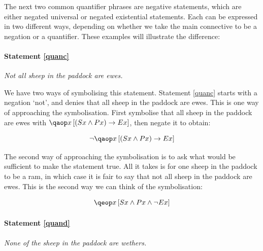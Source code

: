 \documentclass[PHIL101-Textbook.tex]{subfiles}
\begin{document}
The next two common quantifier phrases are negative statements, which are either negated universal or negated existential statements. Each can be expressed in two different ways, depending on whether we take the main connective to be a negation or a quantifier. These examples will illustrate the difference:

\paragraph{Statement \ref{quanc}} \emph{Not all sheep in the paddock are ewes.}

We have two ways of symbolising this statement.
Statement \ref{quanc} starts with a negation `not', and denies that all sheep in the paddock are ewes. This is one way of approaching the symbolisation. First symbolise that all sheep in the paddock are ewes with $\qab{x}{(S x \eand P x ) \eif E x }$, then negate it to obtain:

$$\enot \qab{x}{(S x \eand P x ) \eif E x }$$

\noindent The second way of approaching the symbolisation is to ask what would be sufficient to make the statement true. All it takes is for one sheep in the paddock to be a ram, in which case it is fair to say that not all sheep in the paddock are ewes. This is the second way we can think of the symbolisation:

$$\qeb{x}{S x  \eand P x  \eand \enot E x }$$



\paragraph{Statement \ref{quand}} \emph{None of the sheep in the paddock are wethers.}
\end{document}
